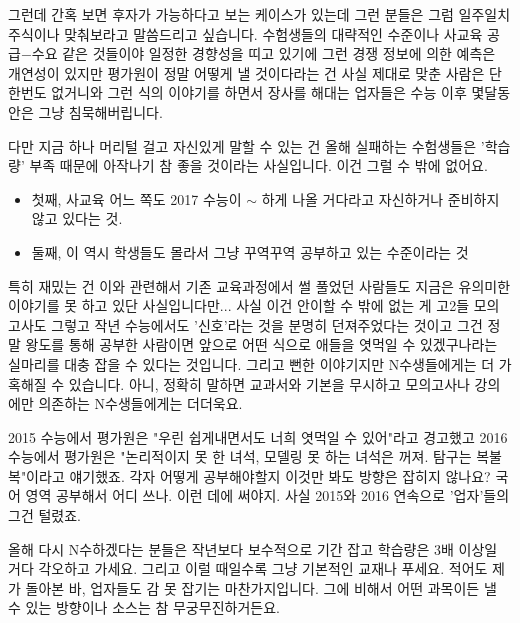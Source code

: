 그런데 간혹 보면 후자가 가능하다고 보는 케이스가 있는데 그런 분들은 그럼 일주일치 주식이나 맞춰보라고 말씀드리고 싶습니다.
수험생들의 대략적인 수준이나 사교육 공급$-$수요 같은 것들이야 일정한 경향성을 띠고 있기에 그런 경쟁 정보에 의한 예측은 개연성이 있지만
평가원이 정말 어떻게 낼 것이다라는 건 사실 제대로 맞춘 사람은 단 한번도 없거니와
그런 식의 이야기를 하면서 장사를 해대는 업자들은 수능 이후 몇달동안은 그냥 침묵해버립니다.
\vspace{5mm}

다만 지금 하나 머리털 걸고 자신있게 말할 수 있는 건
올해 실패하는 수험생들은 '학습량' 부족 때문에 아작나기 참 좋을 것이라는 사실입니다.
이건 그럴 수 밖에 없어요.
\begin{itemize}
    \item 첫째, 사교육 어느 쪽도 2017 수능이 $\sim$ 하게 나올 거다라고 자신하거나 준비하지 않고 있다는 것.
    \item 둘째, 이 역시 학생들도 몰라서 그냥 꾸역꾸역 공부하고 있는 수준이라는 것
\end{itemize}
\vspace{5mm}

특히 재밌는 건 이와 관련해서 기존 교육과정에서 썰 풀었던 사람들도 지금은 유의미한 이야기를 못 하고 있단 사실입니다만...
사실 이건 안이할 수 밖에 없는 게 고2들 모의고사도 그렇고 작년 수능에서도 '신호'라는 것을 분명히 던져주었다는 것이고
그건 정말 왕도를 통해 공부한 사람이면 앞으로 어떤 식으로 애들을 엿먹일 수 있겠구나라는 실마리를 대충 잡을 수 있다는 것입니다.
그리고 뻔한 이야기지만 N수생들에게는 더 가혹해질 수 있습니다.
아니, 정확히 말하면 교과서와 기본을 무시하고 모의고사나 강의에만 의존하는 N수생들에게는 더더욱요.
\vspace{5mm}

2015 수능에서 평가원은 "우린 쉽게내면서도 너희 엿먹일 수 있어"라고 경고했고
2016 수능에서 평가원은 "논리적이지 못 한 녀석, 모델링 못 하는 녀석은 꺼져. 탐구는 복불복"이라고 얘기했죠.
각자 어떻게 공부해야할지 이것만 봐도 방향은 잡히지 않나요? 국어 영역 공부해서 어디 쓰나. 이런 데에 써야지.
사실 2015와 2016 연속으로 '업자'들의 그건 털렸죠.
\vspace{5mm}

올해 다시 N수하겠다는 분들은 작년보다 보수적으로 기간 잡고 학습량은 3배 이상일 거다 각오하고 가세요.
그리고 이럴 때일수록 그냥 기본적인 교재나 푸세요. 적어도 제가 돌아본 바, 업자들도 감 못 잡기는 마찬가지입니다.
그에 비해서 어떤 과목이든 낼 수 있는 방향이나 소스는 참 무궁무진하거든요.
\vspace{5mm}






